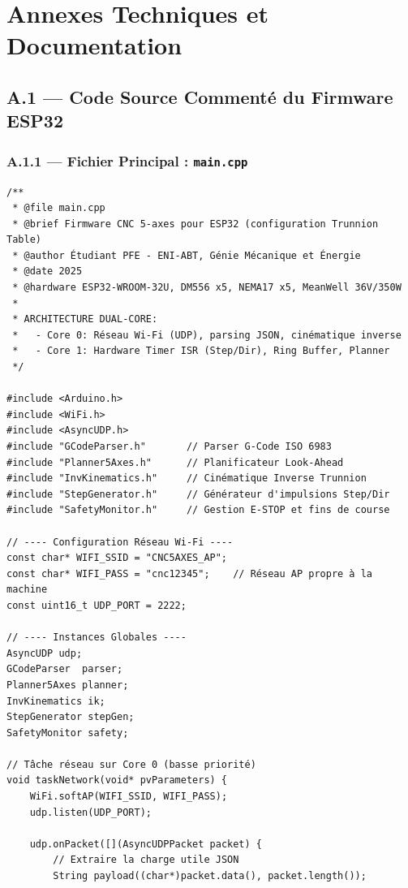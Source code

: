 \chapter{Annexes Techniques et Documentation}
\label{annexe:documentation}

\section{A.1 — Code Source Commenté du Firmware ESP32}

\subsection{A.1.1 — Fichier Principal : \texttt{main.cpp}}

\begin{tcolorbox}[colback=gray!5, colframe=macouleur, title=\texttt{main.cpp} -- Point d'entrée du firmware ESP32]
\begin{verbatim}
/**
 * @file main.cpp
 * @brief Firmware CNC 5-axes pour ESP32 (configuration Trunnion Table)
 * @author Étudiant PFE - ENI-ABT, Génie Mécanique et Énergie
 * @date 2025
 * @hardware ESP32-WROOM-32U, DM556 x5, NEMA17 x5, MeanWell 36V/350W
 *
 * ARCHITECTURE DUAL-CORE:
 *   - Core 0: Réseau Wi-Fi (UDP), parsing JSON, cinématique inverse
 *   - Core 1: Hardware Timer ISR (Step/Dir), Ring Buffer, Planner
 */

#include <Arduino.h>
#include <WiFi.h>
#include <AsyncUDP.h>
#include "GCodeParser.h"       // Parser G-Code ISO 6983
#include "Planner5Axes.h"      // Planificateur Look-Ahead
#include "InvKinematics.h"     // Cinématique Inverse Trunnion
#include "StepGenerator.h"     // Générateur d'impulsions Step/Dir
#include "SafetyMonitor.h"     // Gestion E-STOP et fins de course

// ---- Configuration Réseau Wi-Fi ----
const char* WIFI_SSID = "CNC5AXES_AP";
const char* WIFI_PASS = "cnc12345";    // Réseau AP propre à la machine
const uint16_t UDP_PORT = 2222;

// ---- Instances Globales ----
AsyncUDP udp;
GCodeParser  parser;
Planner5Axes planner;
InvKinematics ik;
StepGenerator stepGen;
SafetyMonitor safety;

// Tâche réseau sur Core 0 (basse priorité)
void taskNetwork(void* pvParameters) {
    WiFi.softAP(WIFI_SSID, WIFI_PASS);
    udp.listen(UDP_PORT);
    
    udp.onPacket([](AsyncUDPPacket packet) {
        // Extraire la charge utile JSON
        String payload((char*)packet.data(), packet.length());
        

\end{verbatim}
\end{tcolorbox}
